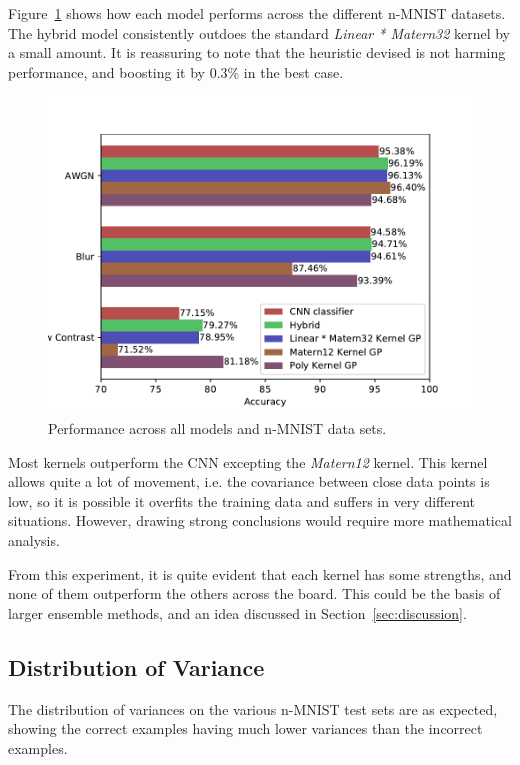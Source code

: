 \documentclass{article}
\begin{document}
Figure~\ref{fig:nmnist:accuracies} shows how each model performs across the different n-MNIST datasets. The hybrid model consistently outdoes the standard \textit{Linear * Matern32} kernel by a small amount. It is reassuring to note that the heuristic devised is not harming performance, and boosting it by 0.3\% in the best case.


\begin{figure}[h]
\centering
\includegraphics[width=\hsize]{figures/nmnist/all_accuracies.pdf}
\caption{Performance across all models and n-MNIST data sets.}
\label{fig:nmnist:accuracies}
\end{figure}

Most kernels outperform the CNN excepting the \textit{Matern12} kernel. This kernel allows quite a lot of movement, i.e. the covariance between close data points is low, so it is possible it overfits the training data and suffers in very different situations. However, drawing strong conclusions would require more mathematical analysis.

From this experiment, it is quite evident that each kernel has some strengths, and none of them outperform the others across the board. This could be the basis of larger ensemble methods, and an idea discussed in Section~\ref{sec:discussion}.

\subsection{Distribution of Variance}

The distribution of variances on the various n-MNIST test sets are as expected, showing the correct examples having much lower variances than the incorrect examples.
\end{document}
